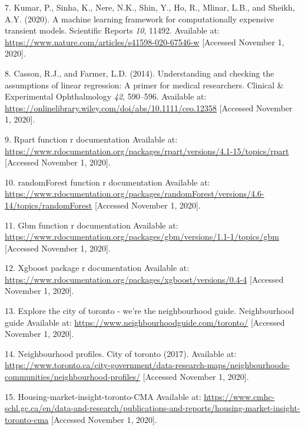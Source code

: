 \documentclass[11pt,]{article}
\begin{document}
\leavevmode\hypertarget{ref-kumar_machine_2020}{}%
7. Kumar, P., Sinha, K., Nere, N.K., Shin, Y., Ho, R., Mlinar, L.B., and
Sheikh, A.Y. (2020). A machine learning framework for computationally
expensive transient models. Scientific Reports \emph{10}, 11492.
Available at: \url{https://www.nature.com/articles/s41598-020-67546-w}
{[}Accessed November 1, 2020{]}.

\leavevmode\hypertarget{ref-casson_understanding_2014}{}%
8. Casson, R.J., and Farmer, L.D. (2014). Understanding and checking the
assumptions of linear regression: A primer for medical researchers.
Clinical \& Experimental Ophthalmology \emph{42}, 590--596. Available
at: \url{https://onlinelibrary.wiley.com/doi/abs/10.1111/ceo.12358}
{[}Accessed November 1, 2020{]}.

\leavevmode\hypertarget{ref-noauthor_rpart_nodate}{}%
9. Rpart function r documentation Available at:
\url{https://www.rdocumentation.org/packages/rpart/versions/4.1-15/topics/rpart}
{[}Accessed November 1, 2020{]}.

\leavevmode\hypertarget{ref-noauthor_randomforest_nodate}{}%
10. randomForest function r documentation Available at:
\url{https://www.rdocumentation.org/packages/randomForest/versions/4.6-14/topics/randomForest}
{[}Accessed November 1, 2020{]}.

\leavevmode\hypertarget{ref-noauthor_gbm_nodate}{}%
11. Gbm function r documentation Available at:
\url{https://www.rdocumentation.org/packages/gbm/versions/1.1-1/topics/gbm}
{[}Accessed November 1, 2020{]}.

\leavevmode\hypertarget{ref-noauthor_xgboost_nodate}{}%
12. Xgboost package r documentation Available at:
\url{https://www.rdocumentation.org/packages/xgboost/versions/0.4-4}
{[}Accessed November 1, 2020{]}.

\leavevmode\hypertarget{ref-noauthor_explore_nodate}{}%
13. Explore the city of toronto - we're the neighbourhood guide.
Neighbourhood guide Available at:
\url{https://www.neighbourhoodguide.com/toronto/} {[}Accessed November
1, 2020{]}.

\leavevmode\hypertarget{ref-noauthor_neighbourhood_2017}{}%
14. Neighbourhood profiles. City of toronto (2017). Available at:
\url{https://www.toronto.ca/city-government/data-research-maps/neighbourhoods-communities/neighbourhood-profiles/}
{[}Accessed November 1, 2020{]}.

\leavevmode\hypertarget{ref-noauthor_housing-market-insight-toronto-cma_nodate}{}%
15. Housing-market-insight-toronto-CMA Available at:
\url{https://www.cmhc-schl.gc.ca/en/data-and-research/publications-and-reports/housing-market-insight-toronto-cma}
{[}Accessed November 1, 2020{]}.
\end{document}
